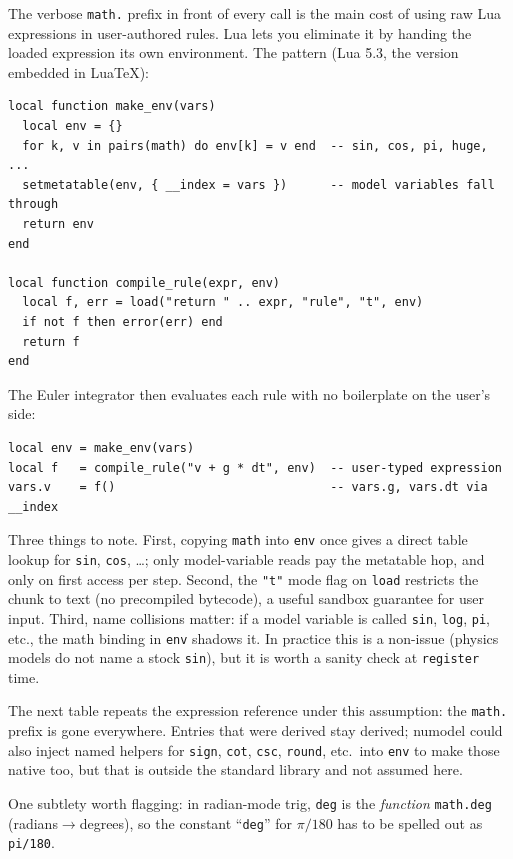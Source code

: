 \documentclass{article}
\begin{document}
The verbose \texttt{math.} prefix in front of every call is the main
cost of using raw Lua expressions in user-authored rules.  Lua lets
you eliminate it by handing the loaded expression its own
environment.  The pattern (Lua 5.3, the version embedded in LuaTeX):

\begin{verbatim}
local function make_env(vars)
  local env = {}
  for k, v in pairs(math) do env[k] = v end  -- sin, cos, pi, huge, ...
  setmetatable(env, { __index = vars })      -- model variables fall through
  return env
end

local function compile_rule(expr, env)
  local f, err = load("return " .. expr, "rule", "t", env)
  if not f then error(err) end
  return f
end
\end{verbatim}

The Euler integrator then evaluates each rule with no boilerplate on
the user's side:

\begin{verbatim}
local env = make_env(vars)
local f   = compile_rule("v + g * dt", env)  -- user-typed expression
vars.v    = f()                              -- vars.g, vars.dt via __index
\end{verbatim}

Three things to note.  First, copying \texttt{math} into \texttt{env}
once gives a direct table lookup for \texttt{sin}, \texttt{cos},
\dots; only model-variable reads pay the metatable hop, and only on
first access per step.  Second, the \texttt{"t"} mode flag on
\texttt{load} restricts the chunk to text (no precompiled bytecode),
a useful sandbox guarantee for user input.  Third, name collisions
matter: if a model variable is called \texttt{sin}, \texttt{log},
\texttt{pi}, etc., the math binding in \texttt{env} shadows it.  In
practice this is a non-issue (physics models do not name a stock
\texttt{sin}), but it is worth a sanity check at \texttt{register}
time.

The next table repeats the expression reference under this
assumption: the \texttt{math.} prefix is gone everywhere.  Entries
that were derived stay derived; \textsf{numodel} could also inject
named helpers for \texttt{sign}, \texttt{cot}, \texttt{csc},
\texttt{round}, etc.\ into \texttt{env} to make those native too,
but that is outside the standard library and not assumed here.

One subtlety worth flagging: in radian-mode trig, \texttt{deg} is the
\emph{function} \texttt{math.deg} (radians$\to$degrees), so the
constant ``\texttt{deg}'' for $\pi/180$ has to be spelled out as
\texttt{pi/180}.
\end{document}
